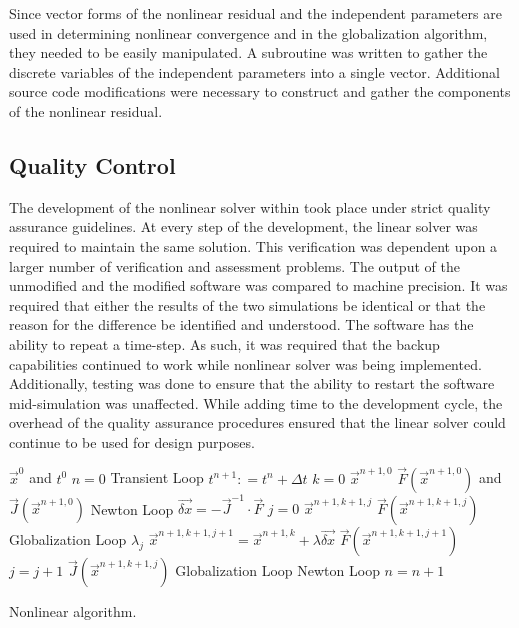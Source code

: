 Since vector forms of the nonlinear residual and the independent parameters are used in determining nonlinear convergence and in the globalization algorithm, they needed to be easily manipulated.
A subroutine was written to gather the discrete variables of the independent parameters into a single vector.
Additional source code modifications were necessary to construct and gather the components of the nonlinear residual.

\subsection{Quality Control}
\label{subsect:nlnDevelopment}
The development of the nonlinear solver within \cobra{} took place under strict quality assurance guidelines.
At every step of the development, the linear solver was required to maintain the same solution.
This verification was dependent upon a larger number of verification and assessment problems.
The output of the unmodified \cobra{} and the modified \cobra{} software was compared to machine precision.
It was required that either the results of the two simulations be identical or that the reason for the difference be identified and understood.
The \cobra{} software has the ability to repeat a time-step.
As such, it was required that the backup capabilities continued to work while nonlinear solver was being implemented.
Additionally, testing was done to ensure that the ability to restart the software mid-simulation was unaffected.
While adding time to the development cycle, the overhead of the quality assurance procedures ensured that the linear solver could continue to be used for design purposes.

\begin{algo}[H]
\setlength{\baselineskip}{0.625\baselineskip}
\begin{algorithmic}[1]
\Require $\vec{x}^{0}$ and $t^{0}$
\Set $n = 0$
\Loop \; Transient Loop
    \State $t^{n+1} : = t^{n} + \Delta t$
    \State $k = 0$
    \Define $\vec{x}^{n+1,0}$
	\Calculate $\vec{F}(\vec{x}^{n+1,0})$ and $\vec{J}(\vec{x}^{n+1,0})$
    \Loop \; Newton Loop
		\Calculate $\vec{\delta x} = - \vec{J}^{-1}\cdot\vec{F}$
		$j = 0$		
		\Calculate $\vec{x}^{n+1,k+1,j}$
		\Calculate $\vec{F}(\vec{x}^{n+1,k+1,j})$
		\Loop \; Globalization Loop
				\Calculate $\lambda_j$
				\Calculate $\vec{x}^{n+1,k+1,j+1} = \vec{x}^{n+1,k} + \lambda \vec{\delta x}$
				\Calculate $\vec{F}(\vec{x}^{n+1,k+1,j+1})$
				\State $j = j + 1$			
			\Else
				\Calculate $\vec{J}(\vec{x}^{n+1,k+1,j})$
				\Exit Globalization Loop
			\EndIf
		\EndLoop			
			\Exit Newton Loop
		\EndIf
	\EndLoop
	\State $n = n + 1$
\EndLoop
\end{algorithmic}
\caption{Nonlinear \cobra{} algorithm.}
\label{alg:nl_cobra}
\end{algo}



